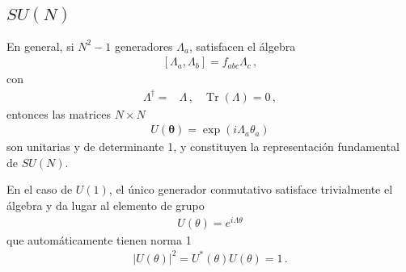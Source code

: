 \begin{frame}
\end{frame}


\subsection{$SU(N)$}

\begin{frame}
En general, si $N^{2}-1$ generadores $\Lambda_a$, satisfacen el álgebra
\begin{align}
  \left[ \Lambda_a,\Lambda_b \right]=f_{abc}\Lambda_{c}\,,
\end{align}
con
\begin{align}
  \Lambda^{\dagger}=&\Lambda\,, & \operatorname{Tr}(\Lambda)=0\,,
\end{align}
entonces las matrices $N\times N$  
\begin{align}
  U(\boldsymbol{\theta})=\exp\left( i \Lambda_{a}\theta_{a} \right)
\end{align}
son unitarias y de determinante 1, y constituyen la representación fundamental de $SU(N)$.
\end{frame}

En el caso de $U(1)$, el único generador conmutativo satisface trivialmente el álgebra y da lugar al elemento de grupo
\begin{align}
  U(\theta)=e^{i\Lambda \theta}
\end{align}
que automáticamente tienen norma 1
\begin{align*}
|U(\theta)|^2= U^{*}(\theta)U(\theta)=1\,.
\end{align*}

